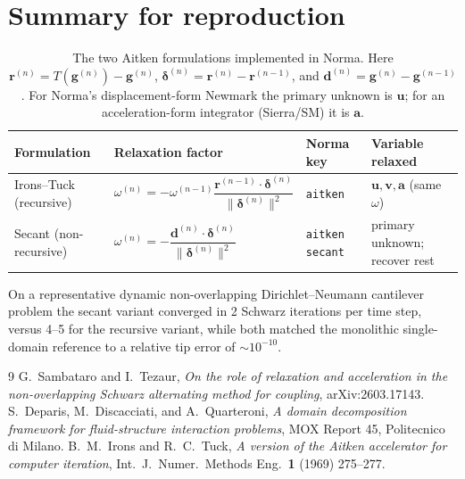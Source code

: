 \documentclass[11pt]{article}
\begin{document}
\section{Summary for reproduction}

\begin{table}[ht!]
\centering
\small
\begin{tabular}{@{}llll@{}}
\toprule
Formulation & Relaxation factor & Norma key & Variable relaxed \\
\midrule
Irons--Tuck (recursive) &
$\omega^{(n)} = -\omega^{(n-1)}\dfrac{\bm{r}^{(n-1)}\cdot\bm{\delta}^{(n)}}{\lVert\bm{\delta}^{(n)}\rVert^2}$ &
\texttt{aitken} & $\bm{u},\bm{v},\bm{a}$ (same $\omega$) \\[1.4em]
Secant (non-recursive) &
$\omega^{(n)} = -\dfrac{\bm{d}^{(n)}\cdot\bm{\delta}^{(n)}}{\lVert\bm{\delta}^{(n)}\rVert^2}$ &
\texttt{aitken secant} & primary unknown; recover rest \\
\bottomrule
\end{tabular}
\caption{The two Aitken formulations implemented in Norma. Here
$\bm{r}^{(n)} = T(\bm{g}^{(n)}) - \bm{g}^{(n)}$,
$\bm{\delta}^{(n)} = \bm{r}^{(n)} - \bm{r}^{(n-1)}$, and
$\bm{d}^{(n)} = \bm{g}^{(n)} - \bm{g}^{(n-1)}$. For Norma's
displacement-form Newmark the primary unknown is $\bm{u}$; for an
acceleration-form integrator (Sierra/SM) it is $\bm{a}$.}
\end{table}

On a representative dynamic non-overlapping Dirichlet--Neumann cantilever
problem the secant variant converged in \num{2} Schwarz iterations per time
step, versus \numrange{4}{5} for the recursive variant, while both matched the
monolithic single-domain reference to a relative tip error of $\sim\!10^{-10}$.

\begin{thebibliography}{9}
 G.~Sambataro and I.~Tezaur,
\emph{On the role of relaxation and acceleration in the non-overlapping Schwarz
alternating method for coupling}, arXiv:2603.17143.
 S.~Deparis, M.~Discacciati, and A.~Quarteroni,
\emph{A domain decomposition framework for fluid-structure interaction
problems}, MOX Report 45, Politecnico di Milano.
 B.~M.~Irons and R.~C.~Tuck,
\emph{A version of the Aitken accelerator for computer iteration},
Int.\ J.\ Numer.\ Methods Eng.\ \textbf{1} (1969) 275--277.
\end{thebibliography}
\end{document}
